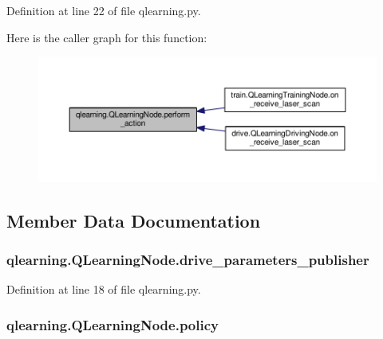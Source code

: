Definition at line 22 of file qlearning.\+py.



Here is the caller graph for this function\+:
\nopagebreak
\begin{figure}[H]
\begin{center}
\leavevmode
\includegraphics[width=350pt]{classqlearning_1_1_q_learning_node_a70f975497db6b5eee94485397b7c18e6_icgraph}
\end{center}
\end{figure}




\subsection{Member Data Documentation}
\subsubsection[{\texorpdfstring{drive\+\_\+parameters\+\_\+publisher}{drive_parameters_publisher}}]{\setlength{\rightskip}{0pt plus 5cm}qlearning.\+Q\+Learning\+Node.\+drive\+\_\+parameters\+\_\+publisher}\hypertarget{classqlearning_1_1_q_learning_node_a2885dd3e3dbd44c0627829d35f9e0041}{}\label{classqlearning_1_1_q_learning_node_a2885dd3e3dbd44c0627829d35f9e0041}


Definition at line 18 of file qlearning.\+py.

\subsubsection[{\texorpdfstring{policy}{policy}}]{\setlength{\rightskip}{0pt plus 5cm}qlearning.\+Q\+Learning\+Node.\+policy}\hypertarget{classqlearning_1_1_q_learning_node_a2c1150dd506209b085dad03036775375}{}\label{classqlearning_1_1_q_learning_node_a2c1150dd506209b085dad03036775375}


